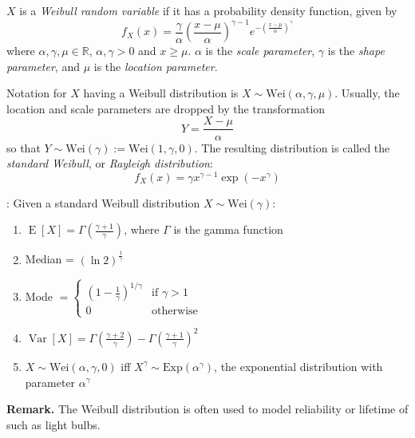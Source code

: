 \documentclass[12pt]{article}
\begin{document}
$X$ is a \emph{Weibull random variable} if it has a probability density function, given by
$$f_X(x)=\frac{\gamma}{\alpha}(\frac{x-\mu}{\alpha})^{\gamma-1}
e^{-(\frac{x-\mu}{\alpha})^\gamma}$$
where $\alpha,\gamma,\mu\in\mathbb{R}$, $\alpha,\gamma>0$ and $x\ge\mu$.  $\alpha$ is the \emph{scale parameter}, $\gamma$ is the \emph{shape parameter}, and $\mu$ is the \emph{location parameter}.

Notation for $X$ having a Weibull distribution is $X\sim \mbox{Wei}(\alpha,\gamma,\mu)$.  Usually, the location and scale parameters are dropped by the transformation $$Y=\frac{X-\mu}{\alpha}$$ so that $Y\sim \mbox{Wei}(\gamma):=\mbox{Wei}(1,\gamma,0)$.  The resulting distribution is called the \emph{standard Weibull}, or \emph{Rayleigh distribution}:
$$f_X(x)=\gamma x^{\gamma-1}\operatorname{exp}(-x^\gamma)$$

\textbf{}:
Given a standard Weibull distribution $X\sim \mbox{Wei}(\gamma)$:
\begin{enumerate}
\item 
$\operatorname{E}[X]=\Gamma(\frac{\gamma+1}{\gamma})$, where $\Gamma$ is the gamma function
\item 
Median = $(\operatorname{ln}2)^{\frac{1}{\gamma}}$
\item
Mode $= \begin{cases}
(1-\frac{1}{\gamma})^{1/\gamma} & \mbox{if $\gamma>1$}\\
0 & \mbox{otherwise} \end{cases}$
\item 
$\operatorname{Var}[X]=\Gamma(\frac{\gamma+2}{\gamma})-\Gamma(\frac{\gamma+1}{\gamma})^2$
\item 
$X\sim \mbox{Wei}(\alpha,\gamma,0)$ iff $X^{\gamma}\sim \mbox{Exp}(\alpha^\gamma)$, the exponential distribution with parameter $\alpha^\gamma$
\end{enumerate}

\textbf{Remark.}
The Weibull distribution is often used to model reliability or lifetime of  such as light bulbs.
\end{document}
